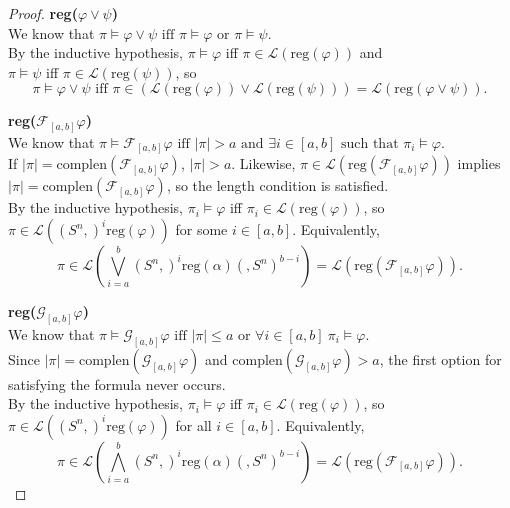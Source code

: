 \documentclass[runningheads]{llncs}
\begin{document}
\begin{proof}
 \noindent \textbf{reg($\varphi \lor \psi$)}\\
 We know that $\pi \vDash \varphi \lor \psi \text{ iff } \pi \vDash \varphi \text{ or } \pi \vDash \psi$.\\
 By the inductive hypothesis, $\pi \vDash \varphi$ iff $\pi \in \mathscr{L}(\text{reg}(\varphi))$ and 
 \\$\pi \vDash \psi$ iff $\pi \in \mathscr{L}(\text{reg}(\psi))$, so
 $$\pi \vDash \varphi \lor \psi \text{ iff } \pi \in (\mathscr{L}(\text{reg}(\varphi)) \lor \mathscr{L}(\text{reg}(\psi))) = \mathscr{L}(\text{reg}(\varphi \lor \psi)).$$
 
 \noindent \textbf{reg($\mathcal{F}_{[a,b]} \varphi$)}\\
 We know that $\pi \vDash \mathcal{F}_{[a,b]} \varphi \text{ iff } |\pi| > a \text{ and } \exists i \in [a,b] \text{ such that } \pi_i \vDash \varphi$.\\
 If $|\pi| = \text{complen}(\mathcal{F}_{[a,b]} \varphi)$, $|\pi| > a$. Likewise, $\pi \in \mathscr{L}\left(\text{reg}\left(\mathcal{F}_{[a,b]} \varphi \right)\right)$ implies $|\pi| = \text{complen}(\mathcal{F}_{[a,b]} \varphi)$, so the length condition is satisfied.\\
 By the inductive hypothesis, $\pi_i \vDash \varphi$ iff $\pi_i \in \mathscr{L}(\text{reg}(\varphi))$, so $\pi \in \mathscr{L}((S^n,)^i \text{reg}(\varphi))$ for some $i \in [a,b]$. Equivalently, 
 $$\pi \in \mathscr{L}\left(\bigvee_{i=a}^{b} (S^n,)^i \text{reg}(\alpha)(,S^n)^{b-i}\right) = \mathscr{L}(\text{reg}(\mathcal{F}_{[a,b]}\varphi)).$$

 \noindent \textbf{reg($\mathcal{G}_{[a,b]} \varphi$)}\\
 We know that $\pi \vDash \mathcal{G}_{[a,b]}\varphi \text{ iff } |\pi| \leq a \text{ or } \forall i \in [a,b] \ \pi_i \vDash \varphi$.\\
 Since $|\pi| = \text{complen}(\mathcal{G}_{[a,b]} \varphi)$ and $\text{complen}(\mathcal{G}_{[a,b]} \varphi) > a$, the first option for satisfying the formula never occurs.\\
 By the inductive hypothesis, $\pi_i \vDash \varphi$ iff $\pi_i \in \mathscr{L}(\text{reg}(\varphi))$, so $\pi \in \mathscr{L}((S^n,)^i \text{reg}(\varphi))$ for all $i \in [a,b]$. Equivalently, 
 $$\pi \in \mathscr{L}\left(\bigwedge_{i=a}^{b} (S^n,)^i \text{reg}(\alpha)(,S^n)^{b-i}\right) = \mathscr{L}(\text{reg}(\mathcal{F}_{[a,b]}\varphi)).$$
 

\end{proof}
\end{document}
